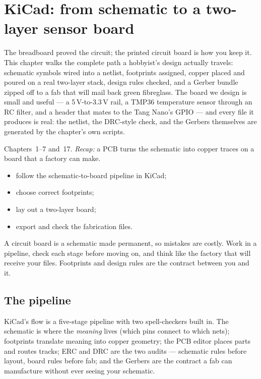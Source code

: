 \chapter{KiCad: from schematic to a two-layer sensor board}\label{ch:kicad}

The breadboard proved the circuit; the printed circuit board is how
you keep it. This chapter walks the complete path a hobbyist's design
actually travels: schematic symbols wired into a netlist, footprints
assigned, copper placed and poured on a real two-layer stack, design
rules checked, and a Gerber bundle zipped off to a fab that will mail
back green fibreglass. The board we design is small and useful --- a
5\,V-to-3.3\,V rail, a TMP36 temperature sensor through an RC filter,
and a header that mates to the Tang Nano's GPIO --- and every file it
produces is real: the netlist, the DRC-style check, and the Gerbers
themselves are generated by the chapter's own scripts.

\begin{rulebox}
Chapters~1--7 and~17. \emph{Recap:} a PCB turns the schematic into copper traces on a board that a factory can make.
\end{rulebox}
\begin{wins}
\begin{itemize}
\item follow the schematic-to-board pipeline in KiCad;
\item choose correct footprints;
\item lay out a two-layer board;
\item export and check the fabrication files.
\end{itemize}
\end{wins}
\begin{principle}
A circuit board is a schematic made permanent, so mistakes are costly. Work in a pipeline, check each stage before moving on, and think like the factory that will receive your files. Footprints and design rules are the contract between you and it.
\end{principle}

\section{The pipeline}\label{sec:workflow18}

KiCad's flow is a five-stage pipeline with two spell-checkers built
in. The schematic is where the \emph{meaning} lives (which pins
connect to which nets); footprints translate meaning into copper
geometry; the PCB editor places parts and routes tracks; ERC and DRC
are the two audits --- schematic rules before layout, board rules
before fab; and the Gerbers are the contract a fab can manufacture
without ever seeing your schematic.

